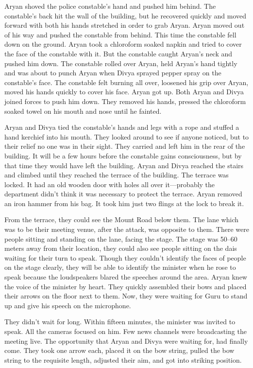 Aryan shoved the police constable's hand and pushed him behind. The constable's
back hit the wall of the building, but he recovered quickly and moved forward
with both his hands stretched in order to grab Aryan. Aryan moved out of his way
and pushed the constable from behind. This time the constable fell down on the
ground. Aryan took a chloroform soaked napkin and tried to cover the face of the
constable with it. But the constable caught Aryan's neck and pushed him down.
The constable rolled over Aryan, held Aryan's hand tightly and was about to
punch Aryan when Divya sprayed pepper spray on the constable's face. The
constable felt burning all over, loosened his grip over Aryan, moved his hands
quickly to cover his face. Aryan got up. Both Aryan and Divya joined forces to
push him down. They removed his hands, pressed the chloroform soaked towel on
his mouth and nose until he fainted.

Aryan and Divya tied the constable's hands and legs with a rope and stuffed a
hand kerchief into his mouth. They looked around to see if anyone noticed, but
to their relief no one was in their sight. They carried and left him in the rear
of the building. It will be a few hours before the constable gains consciousness,
but by that time they would have left the building. Aryan and Divya reached the
stairs and climbed until they reached the terrace of the building. The terrace
was locked. It had an old wooden door with holes all over it—probably the
department didn't think it was necessary to protect the terrace. Aryan removed
an iron hammer from his bag. It took him just two flings at the lock to break
it.

From the terrace, they could see the Mount Road below them. The lane which was
to be their meeting venue, after the attack, was opposite to them. There were
people sitting and standing on the lane, facing the stage. The stage was 50–60
meters away from their location, they could also see people sitting on the dais
waiting for their turn to speak. Though they couldn't identify the faces of
people on the stage clearly, they will be able to identify the minister when he
rose to speak because the loudspeakers blared the speeches around the area.
Aryan knew the voice of the minister by heart. They quickly assembled their bows
and placed their arrows on the floor next to them. Now, they were waiting for
Guru to stand up and give his speech on the microphone.

They didn't wait for long. Within fifteen minutes, the minister was invited to
speak. All the cameras focused on him. Few news channels were broadcasting the
meeting live. The opportunity that Aryan and Divya were waiting for, had finally
come. They took one arrow each, placed it on the bow string, pulled the bow
string to the requisite length, adjusted their aim, and got into striking
position.

